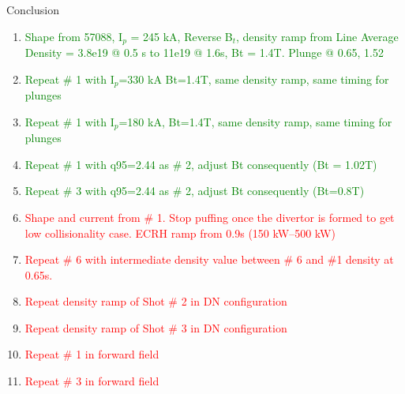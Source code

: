\documentclass[10pt, compress]{beamer}
\newcommand\Fontvi{\fontsize{8}{7.2}\selectfont}
\begin{document}
\begin{frame}{Conclusion}
  \Fontvi
\begin{enumerate}
\item \textcolor{green}{Shape from 57088, I$_p$ = 245 kA,  Reverse B$_t$,
    density ramp from Line Average Density = 3.8e19 @ 0.5 s to 11e19 @ 1.6s,  Bt = 1.4T. Plunge @ 0.65, 1.52}
\item  \textcolor{green}{Repeat \# 1 with I$_p$=330 kA Bt=1.4T, same density ramp, same timing for plunges}
\item  \textcolor{green}{Repeat \# 1 with I$_p$=180 kA, Bt=1.4T, same density ramp, same timing for plunges}
\item  \textcolor{green}{Repeat \# 1 with q95=2.44 as \# 2, adjust Bt consequently (Bt = 1.02T)}
\item  \textcolor{green}{Repeat \# 3 with q95=2.44 as \# 2, adjust Bt consequently (Bt=0.8T)}
\item  \textcolor{red}{Shape and current from \# 1. Stop puffing once the divertor is
  formed to get low collisionality case. ECRH ramp from 0.9s (150
  kW--500 kW)}
\item  \textcolor{red}{Repeat \# 6 with intermediate density value between \# 6 and
  \#1 density at 0.65s.} 
\item  \textcolor{red}{Repeat density ramp of Shot \# 2 in DN configuration} 
\item  \textcolor{red}{Repeat density ramp of Shot \# 3 in DN configuration} 
\item \textcolor{red}{Repeat \# 1 in forward field}
\item \textcolor{red}{Repeat \# 3 in forward field}
\end{enumerate}

\end{frame}
\end{document}
